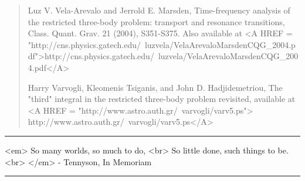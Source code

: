 \begin{quote}
Luz V. Vela-Arevalo and Jerrold E. Marsden,
Time-frequency analysis of the restricted three-body problem:
transport and resonance transitions, Class. Quant. Grav. 21 (2004), 
S351-S375.  Also available at
<A HREF = "http://cns.physics.gatech.edu/~luzvela/VelaArevaloMarsdenCQG_2004.pdf">http://cns.physics.gatech.edu/~luzvela/VelaArevaloMarsdenCQG_2004.pdf</A> 

Harry Varvogli, Kleomenis Tsiganis, and John D. Hadjidemetriou,
The "third" integral in the restricted three-body problem 
revisited, available at
<A HREF = "http://www.astro.auth.gr/~varvogli/varv5.ps">
http://www.astro.auth.gr/~varvogli/varv5.ps</A>

\end{quote} 









\par\noindent\rule{\textwidth}{0.4pt}
<em>     So many worlds, so much to do, <br>
     So little done, such things to be. <br>
</em>
              - Tennyson, In Memoriam
   
\par\noindent\rule{\textwidth}{0.4pt}

